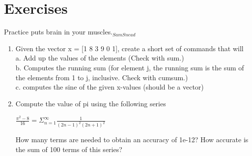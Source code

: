 \documentclass{beamer}
\begin{document}
\section{Exercises}
\begin{frame}[fragile]{}
	\begin{block}{Practice puts brain in your muscles.$_{Sam Snead}$}
		\begin{enumerate}
\item 
Given the vector x = [1 8 3 9 0 1], create a short set of commands that will
\\
   a. Add up the values of the elements (Check with sum.) 
   \\
   b. Computes the running sum (for element j, the running sum is the sum of the
      elements from 1 to j, inclusive.  Check with cumsum.)
      \\
   c. computes the sine of the given x-values (should be a vector)          
   
\item 
Compute the value of pi using the following series

\begin{center}
$
\frac{\pi ^ 2 - 8}{16} = \Sigma_{n=1}^\infty \frac{1}{(2n-1)^2(2n+1)^2}
$
\end{center}


   How many terms are needed to obtain an accuracy of 1e-12?  How accurate is 
   the sum of 100 terms of this series?

    		\end{enumerate}
	\end{block}
\end{frame}
	
\end{document}
